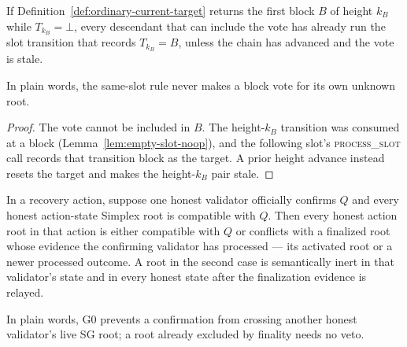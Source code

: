 \begin{lemma}
\label{lem:same-slot-target}
If Definition~\ref{def:ordinary-current-target} returns the first block \(B\)
of height \(k_B\) while \(T_{k_B}=\bot\), every descendant that can include
the vote has already run the slot transition that records \(T_{k_B}=B\),
unless the chain
has advanced and the vote is stale.

In plain words, the same-slot rule never makes a block vote for its own
unknown root.
\end{lemma}

\begin{proof}
The vote cannot be included in \(B\).  The height-\(k_B\) transition
was consumed at a block (Lemma~\ref{lem:empty-slot-noop}), and the
following slot's \textsc{process\_slot} call records that transition
block as the target.  A prior height advance instead resets the
target and makes the height-\(k_B\) pair stale.
\end{proof}

\begin{lemma}
\label{lem:official-confirmation-root-safety}
In a recovery action, suppose one honest validator officially confirms \(Q\)
and every honest action-state Simplex root is compatible with \(Q\).  Then
every honest action root in that action is either compatible with \(Q\)
or conflicts with a finalized root whose evidence the confirming
validator has processed --- its activated root or a newer processed
outcome.  A root in the
second case is semantically inert in that validator's state and in every
honest state after the finalization evidence is relayed.

In plain words, G0 prevents a confirmation from crossing another honest
validator's live SG root; a root already excluded by finality needs no veto.
\end{lemma}

